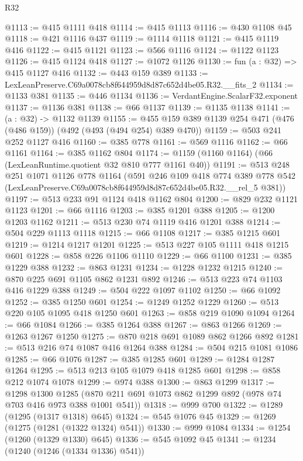 \begin{lexlean}{R32}
\begin{coremodule}
@1113 := @415 @1111 @418
@1114 := @415 @1113
@1116 := @430 @1108 @45
@1118 := @421 @1116 @437
@1119 := @1114 @1118
@1121 := @415 @1119 @416
@1122 := @415 @1121
@1123 := @566 @1116
@1124 := @1122 @1123
@1126 := @415 @1124 @418
@1127 := @1072 @1126
@1130 := fun (a : @32) => @415 @1127 @416
@1132 := @443 @159 @389
@1133 := LexLeanPreserve.C69a0078cb8f644959d8d87c652d4be05.R32.__fits_2
@1134 := @1133 @381
@1135 := @446 @1134
@1136 := VerdantEngine.ScalarF32.exponent
@1137 := @1136 @381
@1138 := @66 @1137
@1139 := @1135 @1138
@1141 := (a : @32) -> @1132 @1139
@1155 := @455 @159 @389 @1139 @254 @471 (@476 (@486 @159)) (@492 (@493 (@494 @254) @389 @470))
@1159 := @503 @241 @252 @1127 @416
@1160 := @385 @778
@1161 := @569 @1116
@1162 := @66 @1161
@1164 := @385 @1162 @804
@1174 := @1159 (@1160 @1164) (@66 (LexLeanRuntime.quotient @32 @810 @777 @1161 @40))
@1191 := @513
    @248
    @251
    @1071
    @1126
    @778
    @1164
    (@591
      @246
      @109
      @418
      @774
      @389
      @778
      @542
      (LexLeanPreserve.C69a0078cb8f644959d8d87c652d4be05.R32.__rel_5 @381))
@1197 := @513 @233 @91 @1124 @418 @1162 @804
@1200 := @829 @232 @1121 @1123
@1201 := @66 @1116
@1203 := @385 @1201 @388
@1205 := @1200 @1203 @1162
@1211 := @513 @230 @74 @1119 @416 @1201 @388
@1214 := @504 @229 @1113 @1118
@1215 := @66 @1108
@1217 := @385 @1215 @601
@1219 := @1214 @1217 @1201
@1225 := @513 @227 @105 @1111 @418 @1215 @601
@1228 := @858 @226 @1106 @1110
@1229 := @66 @1100
@1231 := @385 @1229 @388
@1232 := @863 @1231
@1234 := @1228 @1232 @1215
@1240 := @870 @225 @691 @1105 @862 @1231 @892
@1246 := @513 @223 @74 @1103 @416 @1229 @388
@1249 := @504 @222 @1097 @1102
@1250 := @66 @1092
@1252 := @385 @1250 @601
@1254 := @1249 @1252 @1229
@1260 := @513 @220 @105 @1095 @418 @1250 @601
@1263 := @858 @219 @1090 @1094
@1264 := @66 @1084
@1266 := @385 @1264 @388
@1267 := @863 @1266
@1269 := @1263 @1267 @1250
@1275 := @870 @218 @691 @1089 @862 @1266 @892
@1281 := @513 @216 @74 @1087 @416 @1264 @388
@1284 := @504 @215 @1081 @1086
@1285 := @66 @1076
@1287 := @385 @1285 @601
@1289 := @1284 @1287 @1264
@1295 := @513 @213 @105 @1079 @418 @1285 @601
@1298 := @858 @212 @1074 @1078
@1299 := @974 @388
@1300 := @863 @1299
@1317 := @1298
    @1300
    @1285
    (@870 @211 @691 @1073 @862 @1299 @892 (@978 @74 @703 @416 @973 @388 @1001 @541))
@1318 := @999 @700
@1322 := @1289 (@1295 (@1317 @1318) @645)
@1324 := @545 @1076 @45
@1329 := @1269 (@1275 (@1281 (@1322 @1324) @541))
@1330 := @999 @1084
@1334 := @1254 (@1260 (@1329 @1330) @645)
@1336 := @545 @1092 @45
@1341 := @1234 (@1240 (@1246 (@1334 @1336) @541))

\end{coremodule}
\end{lexlean}
